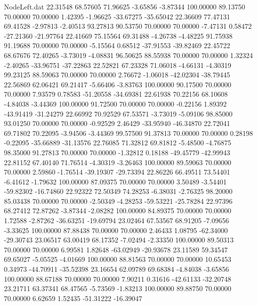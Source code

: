 \begin{filecontents}{NodeLeft.dat}
  22.31548   68.57605   71.96625    -3.65856   -3.87344  100.00000   89.13750   70.00000   70.00000    1.42395   -1.96625  -33.67275  -35.65042
  22.36609   77.47131   69.41528    -2.97813   -2.40513   93.27813   90.53750   70.00000   70.00000   -7.47131    0.58472  -27.21360  -21.97764
  22.41669   75.15564   69.31488    -4.26738   -4.48225   91.75938   91.19688   70.00000   70.00000   -5.15564    0.68512  -37.91553  -39.82469
  22.45722   68.67676   72.40265    -3.73019   -4.08831   96.50625   88.55938   70.00000   70.00000    1.32324   -2.40265  -33.96751  -37.22863
  22.52821   67.23328   71.06018    -4.66131   -4.30319   99.23125   88.59063   70.00000   70.00000    2.76672   -1.06018  -42.02304  -38.79445
  22.56869   62.06421   69.21417    -5.66406   -3.83763  100.00000   90.17500   70.00000   70.00000    7.93579    0.78583  -51.20558  -34.69381
  22.61938   70.22156   68.10608    -4.84038   -3.44369  100.00000   91.72500   70.00000   70.00000   -0.22156    1.89392  -43.91419  -31.24279
  22.66992   70.92529   67.53571    -3.73019   -5.09106   98.85000   93.01250   70.00000   70.00000   -0.92529    2.46429  -33.95940  -46.34870
  22.72041   69.71802   70.22095    -3.94506   -3.44369   99.57500   91.37813   70.00000   70.00000    0.28198   -0.22095  -35.66889  -31.13576
  22.76085   71.32812   69.81812    -5.48500   -4.76875   98.35000   91.27813   70.00000   70.00000   -1.32812    0.18188  -49.45779  -42.99943
  22.81152   67.40140   71.76514    -4.30319   -3.26463  100.00000   89.59063   70.00000   70.00000    2.59860   -1.76514  -39.19307  -29.73394
  22.86226   66.49511   73.54401    -6.41612   -1.79632  100.00000   87.09375   70.00000   70.00000    3.50489   -3.54401  -59.82302  -16.74860
  22.92322   72.50349   74.28253    -6.38031   -2.76325   98.20000   85.03438   70.00000   70.00000   -2.50349   -4.28253  -59.53221  -25.78284
  22.97396   68.27412   72.87262    -3.87344   -2.08282  100.00000   84.89375   70.00000   70.00000    1.72588   -2.87262  -36.63251  -19.69794
  23.02464   67.53567   68.91205    -7.09656   -3.33625  100.00000   87.88438   70.00000   70.00000    2.46433    1.08795  -62.34000  -29.30743
  23.06517   63.00419   68.17352    -7.02494   -2.33350  100.00000   89.50313   70.00000   70.00000    6.99581    1.82648  -63.02949  -20.93678
  23.11589   59.34547   69.65027    -5.05525   -4.01669  100.00000   88.81563   70.00000   70.00000   10.65453    0.34973  -44.70911  -35.52398
  23.16654   62.09789   69.68384    -4.84038   -3.65856  100.00000   88.67188   70.00000   70.00000    7.90211    0.31616  -42.61133  -32.20748
  23.21711   63.37341   68.47565    -5.73569   -1.83213  100.00000   89.88750   70.00000   70.00000    6.62659    1.52435  -51.31222  -16.39047

\end{filecontents}
